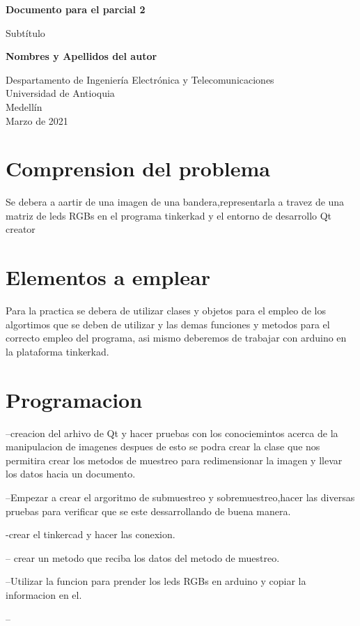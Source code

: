 \documentclass{article}
\begin{document}
\begin{titlepage}
    \begin{center}
        \vspace*{1cm}
            
        \Huge
        \textbf{Documento para el parcial 2}
            
        \vspace{0.5cm}
        \LARGE
        Subtítulo
            
        \vspace{1.5cm}
            
        \textbf{Nombres y Apellidos del autor}
            
        \vfill
            
        \vspace{0.8cm}
            
        \Large
        Despartamento de Ingeniería Electrónica y Telecomunicaciones\\
        Universidad de Antioquia\\
        Medellín\\
        Marzo de 2021
            
    \end{center}
\end{titlepage}

\tableofcontents
\newpage
\section{Comprension del problema}\label{intro}
Se debera a aartir de una imagen de una bandera,representarla a travez de una matriz de leds RGBs en el programa tinkerkad y el entorno de desarrollo Qt creator

\section{Elementos a emplear} \label{contenido}
Para la practica se debera de utilizar clases y objetos para el empleo de los algortimos que se deben de utilizar y las demas funciones y metodos para el correcto empleo del programa, asi mismo deberemos de trabajar con arduino en la plataforma tinkerkad.


\section{Programacion} \label{contenido}
--creacion del arhivo de Qt y hacer pruebas con los conociemintos  acerca de la manipulacion de imagenes 
despues de esto se podra crear la clase que nos permitira crear los metodos de muestreo para redimensionar la imagen y llevar los datos hacia un documento.

--Empezar a crear el argoritmo de submuestreo y sobremuestreo,hacer las diversas pruebas para verificar que se este dessarrollando de buena manera.

-crear el tinkercad y hacer las conexion.

-- crear un metodo que reciba los datos del metodo de muestreo.

--Utilizar la funcion para prender los leds RGBs en arduino y copiar la informacion en el.

--
\end{document}
